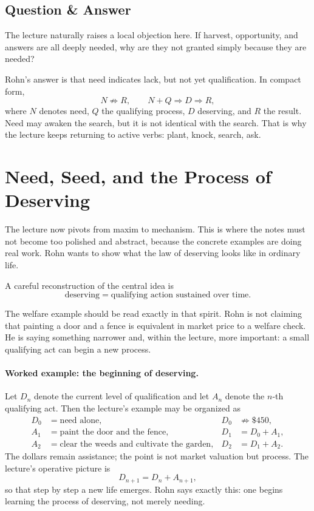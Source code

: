 \subsection{Question \& Answer}

The lecture naturally raises a local objection here. If harvest, opportunity, and answers are all deeply needed, why are they not granted simply because they are needed?

Rohn's answer is that need indicates lack, but not yet qualification. In compact form,
\begin{equation}
N \not\Rightarrow R, \qquad N + Q \Rightarrow D \Rightarrow R,
\end{equation}
where \(N\) denotes need, \(Q\) the qualifying process, \(D\) deserving, and \(R\) the result. Need may awaken the search, but it is not identical with the search. That is why the lecture keeps returning to active verbs: plant, knock, search, ask.

\section{Need, Seed, and the Process of Deserving}

The lecture now pivots from maxim to mechanism. This is where the notes must not become too polished and abstract, because the concrete examples are doing real work. Rohn wants to show what the law of deserving looks like in ordinary life.

A careful reconstruction of the central idea is
\begin{equation}
\text{deserving}=\text{qualifying action sustained over time}.
\end{equation}

The welfare example should be read exactly in that spirit. Rohn is not claiming that painting a door and a fence is equivalent in market price to a welfare check. He is saying something narrower and, within the lecture, more important: a small qualifying act can begin a new process.

\paragraph{Worked example: the beginning of deserving.}
Let \(D_n\) denote the current level of qualification and let \(A_n\) denote the \(n\)-th qualifying act. Then the lecture's example may be organized as
\begin{align}
D_0 &= \text{need alone}, &
D_0 &\not\Rightarrow \$450, \\
A_1 &= \text{paint the door and the fence}, &
D_1 &= D_0 + A_1, \\
A_2 &= \text{clear the weeds and cultivate the garden}, &
D_2 &= D_1 + A_2.
\end{align}
The dollars remain assistance; the point is not market valuation but process. The lecture's operative picture is
\begin{equation}
D_{n+1}=D_n + A_{n+1},
\end{equation}
so that step by step a new life emerges. Rohn says exactly this: one begins learning the process of deserving, not merely needing.

